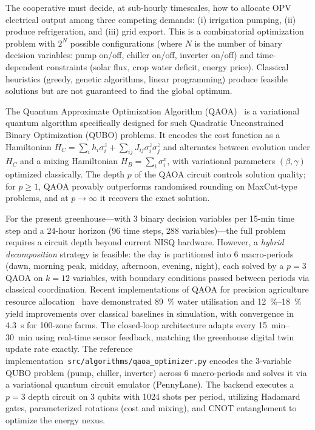 \documentclass[11pt,a4paper]{article}
\begin{document}
The cooperative must decide, at sub-hourly timescales, how to allocate OPV
electrical output among three competing demands: (i) irrigation pumping,
(ii) produce refrigeration, and (iii) grid export. This is a
combinatorial optimization problem with $2^N$ possible configurations
(where $N$ is the number of binary decision variables: pump on/off, chiller
on/off, inverter on/off) and time-dependent constraints (solar flux, crop
water deficit, energy price). Classical heuristics (greedy, genetic algorithms,
linear programming) produce feasible solutions but are not guaranteed to find
the global optimum.

The Quantum Approximate Optimization Algorithm (QAOA)~\cite{Farhi2014} is a
variational quantum algorithm specifically designed for such
Quadratic Unconstrained Binary Optimization (QUBO) problems. It encodes the
cost function as a Hamiltonian $H_C = \sum_i h_i \sigma_i^z + \sum_{ij} J_{ij}
\sigma_i^z \sigma_j^z$ and alternates between evolution under $H_C$ and a
mixing Hamiltonian $H_B = \sum_i \sigma_i^x$, with variational parameters
$(\beta, \gamma)$ optimized classically. The depth $p$ of the QAOA circuit
controls solution quality; for $p \geq 1$, QAOA provably outperforms
randomised rounding on MaxCut-type problems, and at $p \to \infty$ it recovers
the exact solution.

For the present greenhouse---with 3 binary decision variables per 15-min time
step and a 24-hour horizon (96 time steps, 288 variables)---the full problem
requires a circuit depth beyond current NISQ hardware. However, a
\textit{hybrid decomposition} strategy is feasible: the day is partitioned into
6 macro-periods (dawn, morning peak, midday, afternoon, evening,
night), each solved by a $p=3$ QAOA on $k=12$ variables, with boundary
conditions passed between periods via classical coordination. Recent
implementations of QAOA for precision agriculture resource
allocation~\cite{AlSagri2025} have demonstrated \qty{89}{\percent} water
utilisation and \qtyrange{12}{18}{\percent} yield improvements over classical baselines in
simulation, with convergence in \qty{4.3}{\s} for 100-zone farms. The
closed-loop architecture adapts every \qtyrange{15}{30}{\minute} using real-time sensor
feedback, matching the greenhouse digital twin update rate exactly.
The reference implementation~\texttt{src/algorithms/qaoa\_optimizer.py}
encodes the 3-variable QUBO problem (pump, chiller, inverter) across 6 macro-periods
and solves it via a variational quantum circuit emulator (PennyLane). The backend executes a $p=3$ depth circuit on 3 qubits with 1024 shots per period, utilizing Hadamard gates, parameterized rotations (cost and mixing), and CNOT entanglement to optimize the energy nexus.
\end{document}
